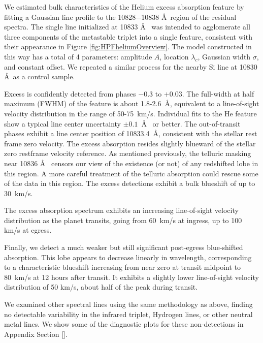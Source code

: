 \documentclass[twocolumn]{aastex631}
\begin{document}

We estimated bulk characteristics of the Helium excess absorption feature by fitting a Gaussian line profile to the 10828$-$10838 \AA~region of the residual spectra.  The single line initialized at 10833 \AA~ was intended to agglomerate all three components of the metastable triplet into a single feature, consistent with their appearance in Figure \ref{fig:HPFheliumOverview}.  The model constructed in this way has a total of 4 parameters: amplitude $A$, location $\lambda_c$, Gaussian width $\sigma$, and constant offset.  We repeated a similar process for the nearby Si line at 10830 \AA~as a control sample.

Excess is confidently detected from phases $-$0.3 to $+$0.03.  The full-width at half maximum (FWHM) of the feature is about 1.8-2.6~\AA, equivalent to a line-of-sight velocity distribution in the range of 50-75~km/s.  Individual fits to the He feature show a typical line center uncertainty $\pm0.1$~\AA~ or better.  The out-of-transit phases exhibit a line center position of 10833.4~\AA, consistent with the stellar  rest frame zero velocity.  The excess absorption resides slightly blueward of the stellar zero restframe velocity reference.  As mentioned previously, the telluric masking near 10836 \AA~ censors our view of the existence (or not) of any redshifted lobe in this region.  A more careful treatment of the telluric absorption could rescue some of the data in this region.  The excess detections exhibit a bulk blueshift of up to 30~km/s.

The excess absorption spectrum exhibits an increasing line-of-sight velocity distribution as the planet transits, going from 60~km/s at ingress, up to 100 km/s at egress.

Finally, we detect a much weaker but still significant post-egress blue-shifted absorption.  This lobe appears to decrease linearly in wavelength, corresponding to a characteristic blueshift increasing from near zero at transit midpoint to 80~km/s at 12 hours after transit.  It exhibits a slightly lower line-of-sight velocity distribution of 50 km/s, about half of the peak during transit.

We examined other spectral lines using the same methodology as above, finding no detectable variability in the  infrared triplet, Hydrogen lines, or other neutral metal lines.  We show some of the diagnostic plots for these non-detections in Appendix Section \ref{}.
\end{document}

